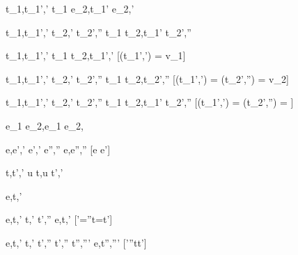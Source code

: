   {t_1,\sigma \stride t_1',\sigma'}
  {t_1 \Next e_2,\sigma \stride t_1' \Next e_2,\sigma'}


  {t_1,\sigma  \stride t_1',\sigma'  \Quad
   t_2,\sigma' \stride t_2',\sigma''}
  {t_1 \And t_2,\sigma \stride t_1' \And t_2',\sigma''}


  {t_1,\sigma  \stride t_1',\sigma'}
  {t_1 \Or t_2,\sigma \stride t_1',\sigma'}
  [\Value(t_1',\sigma') = v_1]

  {t_1,\sigma  \stride t_1',\sigma'  \Quad
   t_2,\sigma' \stride t_2',\sigma''}
  {t_1 \Or t_2,\sigma \stride t_2',\sigma''}
  [\Value(t_1',\sigma') = \bot \land \Value(t_2',\sigma'') = v_2]

  {t_1,\sigma  \stride t_1',\sigma'  \Quad
   t_2,\sigma' \stride t_2',\sigma''}
  {t_1 \Or t_2,\sigma \stride t_1' \Or t_2',\sigma''}
  [\Value(t_1',\sigma') = \bot \land \Value(t_2',\sigma'') = \bot]


  { }
  {e_1 \Xor e_2,\sigma \stride e_1 \Xor e_2,\sigma}

    {e,\sigma \evaluate e',\sigma'  \Quad
     e',\sigma' \stride e'',\sigma''}
    {e,\sigma \stride e'',\sigma''}
    [e \neq e']


  {t,\sigma\stride t',\sigma'}
  {u \At t,\sigma\stride u \At t',\sigma'}









  {e,\sigma \normalise t,\sigma'}


    {e,\sigma \evaluate t,\sigma'  \Quad
     t,\sigma' \stride t',\sigma''}
    {e,\sigma \normalise t,\sigma'}
    [\sigma'=\sigma''\wedge t=t']

    {e,\sigma \evaluate t,\sigma'  \Quad
     t,\sigma' \stride t',\sigma''  \Quad
     t',\sigma'' \normalise t'',\sigma'''}
    {e,\sigma \normalise t'',\sigma'''}
    [\sigma'\neq \sigma''\vee t\neq t']





